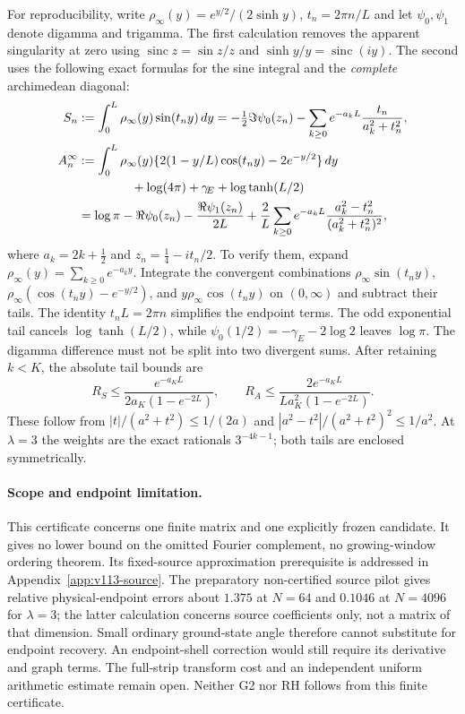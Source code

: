 \documentclass[11pt]{article}
\theoremstyle{remark}
\begin{document}
For reproducibility, write $\rho_\infty(y)=e^{y/2}/(2\sinh y)$,
$t_n=2\pi n/L$ and let $\psi_0,\psi_1$ denote digamma and trigamma.
The first calculation removes the apparent singularity at zero using
$\operatorname{sinc}z=\sin z/z$ and
$\sinh y/y=\operatorname{sinc}(iy)$. The second uses the following
exact formulas for the sine integral and the \emph{complete}
archimedean diagonal:
\begin{align*}
 S_n&:=\int_0^L\rho_\infty(y)\sin(t_ny)\,dy
 =-\tfrac12\Im\psi_0(z_n)
   -\sum_{k\ge0}e^{-a_kL}\frac{t_n}{a_k^2+t_n^2},\\
 A_n^\infty&:=\int_0^L\rho_\infty(y)
  \{2(1-y/L)\cos(t_ny)-2e^{-y/2}\}\,dy\\
 &\hspace{15mm}+\log(4\pi)+\gamma_{\!E}+\log\tanh(L/2)\\
 &=\log\pi-\Re\psi_0(z_n)-\frac{\Re\psi_1(z_n)}{2L}
   +\frac2L\sum_{k\ge0}e^{-a_kL}
          \frac{a_k^2-t_n^2}{(a_k^2+t_n^2)^2},
\end{align*}
where $a_k=2k+\tfrac12$ and $z_n=\tfrac14-it_n/2$.
To verify them, expand $\rho_\infty(y)=\sum_{k\ge0}e^{-a_ky}$.
Integrate the convergent combinations
$\rho_\infty\sin(t_ny)$,
$\rho_\infty(\cos(t_ny)-e^{-y/2})$, and
$y\rho_\infty\cos(t_ny)$ on $(0,\infty)$ and subtract their tails.
The identity $t_nL=2\pi n$ simplifies the endpoint terms. The odd
exponential tail cancels $\log\tanh(L/2)$, while
$\psi_0(1/2)=-\gamma_{\!E}-2\log2$ leaves $\log\pi$.
The digamma difference must not be split into two divergent sums.
After retaining $k<K$, the absolute tail bounds are
\[
 R_S\le\frac{e^{-a_KL}}{2a_K(1-e^{-2L})},\qquad
 R_A\le\frac{2e^{-a_KL}}{La_K^2(1-e^{-2L})}.
\]
These follow from $|t|/(a^2+t^2)\le1/(2a)$ and
$|a^2-t^2|/(a^2+t^2)^2\le1/a^2$. At $\lambda=3$ the weights are
the exact rationals $3^{-4k-1}$; both tails are enclosed symmetrically.

\paragraph{Scope and endpoint limitation.}
This certificate concerns one finite matrix and one explicitly frozen
candidate. It gives no lower bound on the omitted Fourier complement,
no growing-window ordering theorem. Its fixed-source approximation
prerequisite is addressed in Appendix~\ref{app:v113-source}. The preparatory non-certified source pilot gives relative
physical-endpoint errors about $1.375$ at $N=64$ and $0.1046$ at
$N=4096$ for $\lambda=3$; the latter calculation concerns source
coefficients only, not a matrix of that dimension. Small ordinary
ground-state angle therefore cannot substitute for endpoint recovery.
An endpoint-shell correction would still require its derivative and
graph terms. The full-strip transform cost and an independent uniform
arithmetic estimate remain open. Neither G2 nor RH follows from this
finite certificate.
\end{document}
